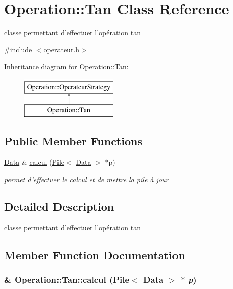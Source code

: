 \hypertarget{classOperation_1_1Tan}{
\section{Operation::Tan Class Reference}
\label{classOperation_1_1Tan}
}


classe permettant d'effectuer l'opération tan  




{\ttfamily \#include $<$operateur.h$>$}

Inheritance diagram for Operation::Tan:\begin{figure}[H]
\begin{center}
\leavevmode
\includegraphics[height=2cm]{classOperation_1_1Tan}
\end{center}
\end{figure}
\subsection*{Public Member Functions}
\begin{DoxyCompactItemize}
\item 
\hyperlink{classNombre_1_1Data}{Data} \& \hyperlink{classOperation_1_1Tan_ae9d01bc9730decc94c85754891844024}{calcul} (\hyperlink{classPile}{Pile}$<$ \hyperlink{classNombre_1_1Data}{Data} $>$ $\ast$p)
\begin{DoxyCompactList}\small\item\em permet d'effectuer le calcul et de mettre la pile à jour \item\end{DoxyCompactList}\end{DoxyCompactItemize}


\subsection{Detailed Description}
classe permettant d'effectuer l'opération tan 

\subsection{Member Function Documentation}
\hypertarget{classOperation_1_1Tan_ae9d01bc9730decc94c85754891844024}{
\subsubsection[{calcul}]{\& Operation::Tan::calcul ({\bf Pile}$<$ {\bf Data} $>$ $\ast$ {\em p})}}
\label{classOperation_1_1Tan_ae9d01bc9730decc94c85754891844024}


